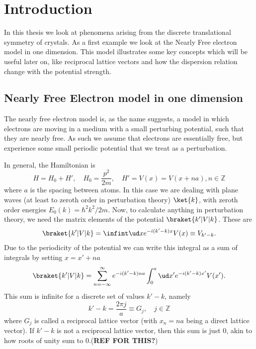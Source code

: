 \documentclass[main.tex]{subfiles}
\begin{document}
	\section{Introduction}
	In this thesis we look at phenomena arising from the discrete translational symmetry of crystals. As a first example we look at the Nearly Free electron model in one dimension. This model illustrates some key concepts which will be useful later on, like reciprocal lattice vectors and how the dispersion relation change with the potential strength.
	
	\subsection{Nearly Free Electron model in one dimension}\label{sec:nearly_free}
	The nearly free electron model is, as the name suggests, a model in which electrons are moving in a medium with a small perturbing potential, such that they are nearly free. As such we assume that electrons are essentially free, but experience some small periodic potential that we treat as a perturbation.
	
	In general, the Hamiltonian is
	\begin{equation}
		H = H_0 + H', \quad H_0 = \frac{p^2}{2m}, \quad H' = V(x) = V(x + na), n \in \mathbb{Z}
	\end{equation}
	where $ a $ is the spacing between atoms. In this case we are dealing with plane waves (at least to zeroth order in perturbation theory) $ \ket{k} $, with zeroth order energies $ E_0(k)= \hbar^2 k^2/2m $. Now, to calculate anything in perturbation theory, we need the matrix elements of the potential $ \braket{k' | V | k} $. These are
	\begin{equation}
		\braket{k' | V | k} = \infint \ud x e^{-i(k'-k)x} V(x) \equiv V_{k'-k}.
	\end{equation}
	Due to the periodicity of the potential we can write this integral as a sum of integrals by setting $ x=x'+na $
	\begin{equation}
		\braket{k' | V | k} = \sum_{n = -\infty}^{\infty} e^{-i(k'-k) na} \int_{0}^{a} \ud x' e^{-i(k'-k)x'} V(x').
	\end{equation}
	This sum is infinite for a discrete set of values $ k'-k $, namely
	\begin{equation}
		k'-k = \frac{2\pi j}{a} \equiv G_j, \quad j \in \mathbb{Z}
	\end{equation}
	where $ G_j $ is called a reciprocal lattice vector (with $ x_n=na $ being a direct lattice vector). If $ k'-k $ is not a reciprocal lattice vector, then this sum is just 0, akin to how roots of unity sum to 0.(\textbf{REF FOR THIS?})
	
\end{document}
